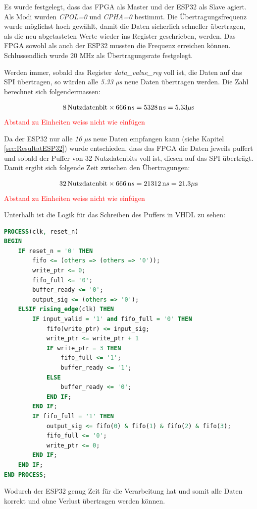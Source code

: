Es wurde festgelegt, dass das FPGA als Master und der ESP32 als Slave agiert. Als Modi wurden \textit{CPOL=0} und \textit{CPHA=0} bestimmt. Die Übertragungsfrequenz wurde möglichst hoch gewählt, damit die Daten sicherlich schneller übertragen, als die neu abgetasteten Werte wieder ins Register geschrieben, werden.
Das FPGA sowohl als auch der ESP32 mussten die Frequenz erreichen können. Schlussendlich wurde 20 MHz als Übertragungsrate festgelegt.

Werden immer, sobald das Register \textit{data\_value\_reg} voll ist, die Daten auf das SPI übertragen, so würden alle \textit{5.33 µs} neue Daten übertragen werden. Die Zahl berechnet sich folgendermassen:

\begin{equation}
    8 \, \text{Nutzdatenbit} \times 666 \, \text  ns = 5328 \, \text  ns = 5.33  \mu\text  s \label{eq:calc_Nutzdatenbit1}
\end{equation}
\textcolor{red}{Abstand zu Einheiten weiss nicht wie einfügen}

Da der ESP32 nur alle \textit{16 µs} neue Daten empfangen kann (siehe Kapitel \ref{sec:ResultatESP32}) wurde entschieden, dass das FPGA die Daten jeweils puffert und sobald der Puffer von 32 Nutzdatenbits voll ist, diesen auf das SPI überträgt. Damit ergibt sich folgende Zeit zwischen den Übertragungen:

\begin{equation}
    32 \, \text{Nutzdatenbit} \times 666 \, \text ns = 21312 \, \text ns = 21.3  \mu\text s \label{eq:calc_Nutzdatenbit2}
\end{equation}
\textcolor{red}{Abstand zu Einheiten weiss nicht wie einfügen}

Unterhalb ist die Logik für das Schreiben des Puffers in VHDL zu sehen:
\begin{lstlisting}[language=vhdl]
PROCESS(clk, reset_n)
BEGIN
    IF reset_n = '0' THEN
        fifo <= (others => (others => '0'));
        write_ptr <= 0;
        fifo_full <= '0';
        buffer_ready <= '0';
        output_sig <= (others => '0');
    ELSIF rising_edge(clk) THEN
        IF input_valid = '1' and fifo_full = '0' THEN
            fifo(write_ptr) <= input_sig;
            write_ptr <= write_ptr + 1
            IF write_ptr = 3 THEN
                fifo_full <= '1';
                buffer_ready <= '1';
            ELSE
                buffer_ready <= '0';
            END IF;
        END IF;
        IF fifo_full = '1' THEN
            output_sig <= fifo(0) & fifo(1) & fifo(2) & fifo(3);
            fifo_full <= '0';
            write_ptr <= 0;
        END IF;
    END IF;
END PROCESS;
\end{lstlisting}

Wodurch der ESP32 genug Zeit für die Verarbeitung hat und somit alle Daten korrekt und ohne Verlust übertragen werden können.